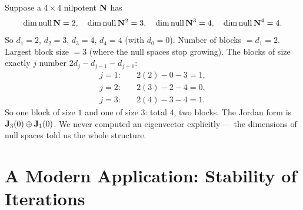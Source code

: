 \begin{example}
\label{ch28:ex-nullgrowth}
Suppose a $4\times4$ nilpotent $\mathbf{N}$ has
\[
\operatorname{dim}\operatorname{null}\mathbf{N}=2,\quad \operatorname{dim}\operatorname{null}\mathbf{N}^2=3,\quad \operatorname{dim}\operatorname{null}\mathbf{N}^3=4,\quad \operatorname{dim}\operatorname{null}\mathbf{N}^4=4.
\]
So $d_1=2$, $d_2=3$, $d_3=4$, $d_4=4$ (with $d_0=0$). Number of blocks $=d_1=2$. Largest block
size $=3$ (where the null spaces stop growing). The blocks of size exactly $j$ number
$2d_j-d_{j-1}-d_{j+1}$:
\begin{align*}
j=1:&\quad 2(2)-0-3=1,\\
j=2:&\quad 2(3)-2-4=0,\\
j=3:&\quad 2(4)-3-4=1.
\end{align*} So one block of size $1$ and one of size $3$: total $4$, two
blocks. The Jordan form is $\mathbf{J}_3(0)\oplus\mathbf{J}_1(0)$. We never computed an
eigenvector explicitly --- the dimensions of null spaces told us the whole structure.
\end{example}

\section{A Modern Application: Stability of Iterations}
\label{ch28:application}

